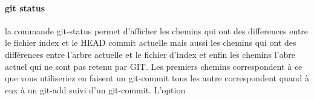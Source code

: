 \documentclass[11pt,canadien]{article}
\begin{document}
\paragraph{git status}la commande git-status permet d'afficher les chemins qui ont des differences entre le fichier index et le HEAD commit actuelle mais aussi les chemins qui ont des différences entre l'arbre actuelle et le fichier d'index et enfin les chemins l'abre actuel qui ne sont pas retenu par GIT. Les premiers chemins correspondent à ce que vous utiliseriez en faisent un git-commit tous les autre correspondent quand à eux à un git-add suivi d'un git-commit. L'option \textt{-s] ou \textt{--short} permet de formater l'affichage de la commande dans le format \textt{short}.

\newpage
\section{Utilisation de Github}
Blablabla

\newpage
\begin{appendices} %


\end{appendices}}
\end{document}
